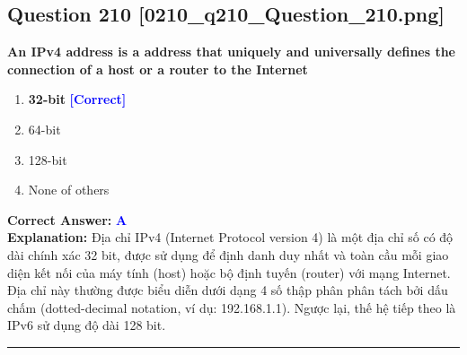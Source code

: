 \documentclass[11pt,a4paper]{article}
\begin{document}
\begin{minipage}{\textwidth}
\subsection*{Question 210 \quad \footnotesize{[0210\_q210\_Question\_210.png]}}
\noindent \textbf{An IPv4 address is a address that uniquely and universally defines the connection of a host or a router to the Internet}

\begin{enumerate}[label=\Alph*.]
    \item \textbf{32-bit} \hfill \textcolor{blue}{\textbf{[Correct]}}
    \item 64-bit
    \item 128-bit
    \item None of others
\end{enumerate}

\noindent \textbf{Correct Answer:} \textcolor{blue}{\textbf{A}} \\[2pt]
\noindent \textbf{Explanation:} Địa chỉ IPv4 (Internet Protocol version 4) là một địa chỉ số có độ dài chính xác 32 bit, được sử dụng để định danh duy nhất và toàn cầu mỗi giao diện kết nối của máy tính (host) hoặc bộ định tuyến (router) với mạng Internet. Địa chỉ này thường được biểu diễn dưới dạng 4 số thập phân phân tách bởi dấu chấm (dotted-decimal notation, ví dụ: 192.168.1.1). Ngược lại, thế hệ tiếp theo là IPv6 sử dụng độ dài 128 bit.

\par\vspace{0.3cm}
\hrule
\vspace{0.3cm}
\end{minipage}
\end{document}

